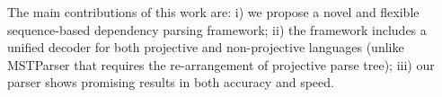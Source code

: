 The main contributions of this work are:
i) we propose a novel and flexible sequence-based dependency parsing framework;
ii) the framework includes a unified decoder for both projective and
non-projective languages
(unlike MSTParser that requires the re-arrangement of projective parse tree);
iii) our parser shows promising results in both accuracy and speed.
